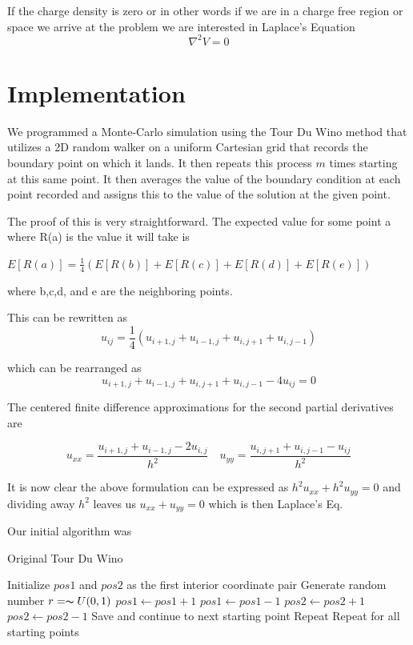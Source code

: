 \documentclass{amsart}
\begin{document}
If the charge density is zero or in other words if we are in a charge free region or space we arrive at the problem we are interested in Laplace's Equation
$$\nabla ^2 V=0$$

\section{Implementation}
We programmed a Monte-Carlo simulation using the Tour Du Wino method that utilizes a 2D random walker on a uniform Cartesian grid that records the boundary point on which it lands. It then repeats this process $m$ times starting at this same point. It then averages the value of the boundary condition at each point recorded and assigns this to the value of the solution at the given point.\cite{farlow2012partial}

The proof of this is very straightforward. The expected value for some point a where R(a) is the value it will take is

$ E[R(a)] = \frac{1}{4} (E[R(b)] + E[R(c)] + E[R(d)] + E[R(e)]  )$

where b,c,d, and e are the neighboring points.

This can be rewritten as
\begin{equation}
u_{ij} = \frac{1}{4} (u_{i+1,j} + u_{i-1,j} + u_{i,j+1} + u_{i,j-1})
\end{equation}

which can be rearranged as
\begin{equation*}
u_{i+1,j} + u_{i-1,j} + u_{i,j+1} + u_{i,j-1} - 4u_{ij} = 0
\end{equation*}

The centered finite difference approximations for the second partial derivatives are

\begin{equation*} 
	u_{xx} = \frac{u_{i+1,j} + u_{i-1,j} - 2u_{i,j}}{h^2} \quad u_{yy} = \frac{u_{i,j+1} + u_{i,j-1} - u_{ij}}{h^2}
\end{equation*}

It is now clear the above formulation can be expressed as $h^2 u_{xx} + h^2 u_{yy} = 0$ and dividing away $h^2$ leaves us $u_{xx} + u_{yy} = 0$ which is then Laplace's Eq.

Our initial algorithm was
\begin{algorithm}
	\caption{Original Tour Du Wino}
	\begin{algorithmic}[1]
		\State Initialize $pos1$ and $pos2$ as the first interior coordinate pair
		\State Generate random number $r = \thicksim U(0,1)$
			\State $pos1 \gets pos1 + 1$
			\State $pos1 \gets pos1 - 1$
			\State $pos2 \gets pos2 + 1$
		\Else
			\State $pos2 \gets pos2 - 1$
		\EndIf
			\State Save and continue to next starting point
		\Else
			\State Repeat
		\EndIf
		\State Repeat for all starting points
	\end{algorithmic}
\end{algorithm}
\end{document}
